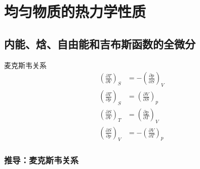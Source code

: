 \section{均匀物质的热力学性质}
\subsection{内能、焓、自由能和吉布斯函数的全微分}


麦克斯韦关系
\begin{equation}
    \begin{aligned}
        \left( \frac{\partial T}{\partial V} \right) _S&=-\left( \frac{\partial p}{\partial S} \right) _V
\\
\left( \frac{\partial T}{\partial p} \right) _S&=\left( \frac{\partial V}{\partial S} \right) _p
\\
\left( \frac{\partial S}{\partial V} \right) _T&=\left( \frac{\partial p}{\partial T} \right) _V
\\
\left( \frac{\partial S}{\partial p} \right) _V&=-\left( \frac{\partial V}{\partial T} \right) _p
    \end{aligned}
\end{equation}




\subsubsection{推导：麦克斯韦关系}

